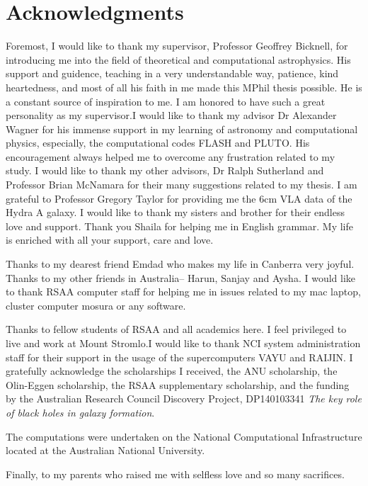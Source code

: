 \section*{Acknowledgments}

%
%
%
%
%
%
%
%
%
%
%
%


Foremost, I would like to thank my supervisor, Professor Geoffrey Bicknell, for introducing me into the field of theoretical and computational astrophysics. His support and guidence, teaching in a very understandable way, patience, kind heartedness, and most of all his faith in me made this MPhil thesis possible. He is a constant source of inspiration to me. I am honored to have such a great personality as my supervisor.I would like to thank my advisor Dr Alexander Wagner for his immense support in my learning of astronomy and computational physics, especially, the computational codes FLASH and PLUTO. His encouragement always helped me to overcome any frustration related to my study. 
I would like to thank my other advisors, Dr Ralph Sutherland and Professor Brian McNamara for their many suggestions related to my thesis. I am grateful to Professor Gregory Taylor for providing me the 6cm VLA data of the Hydra A galaxy. I would like to thank my sisters and brother for their endless love and support. Thank you Shaila for helping me in English grammar. My life is enriched with all your support, care and love. 

Thanks to my dearest friend Emdad who makes my life in Canberra very joyful. Thanks to my other friends in Australia-- Harun, Sanjay and Aysha. I would like to thank RSAA computer staff for helping me in issues related to my mac laptop, cluster computer mosura or any software.

Thanks to fellow students of RSAA and all academics here. I feel privileged to live and work at Mount Stromlo.I would like to thank NCI system administration staff for their support in the usage of the supercomputers VAYU and RAIJIN. I gratefully acknowledge the scholarships I received, the ANU scholarship, the Olin-Eggen scholarship, the RSAA supplementary scholarship, and the funding by the Australian Research Council Discovery Project, DP140103341 \textit{The key role of black holes in galaxy formation}. 

The computations were undertaken on the National Computational Infrastructure located at the Australian National University. 

Finally, to my parents who raised me with selfless love and so many sacrifices.





